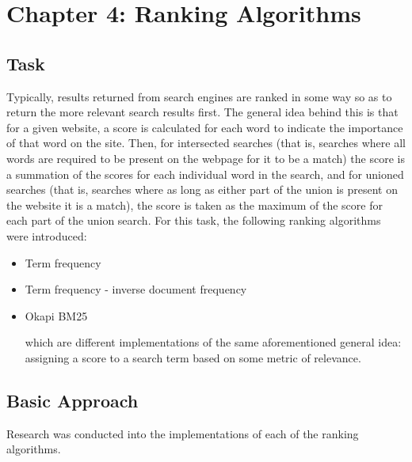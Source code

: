 \chapter{Chapter 4: Ranking Algorithms}

\section{Task}
Typically, results returned from search engines are ranked in some way so as to return the more relevant search results first.
The general idea behind this is that for a given website, a score is calculated for each word to indicate the importance of that word on the site.
Then, for intersected searches (that is, searches where all words are required to be present on the webpage for it to be a match) the score is a summation of the scores for each individual word in the search,
and for unioned searches (that is, searches where as long as either part of the union is present on the website it is a match), the score is taken as the maximum of the score for each part of the union search.
For this task, the following ranking algorithms were introduced:

\begin{itemize}

\item Term frequency

\item Term frequency - inverse document frequency

\item Okapi BM25

which are different implementations of the same aforementioned general idea: assigning a score to a search term based on some metric of relevance.

\end{itemize}

\section{Basic Approach}
Research was conducted into the implementations of each of the ranking algorithms.

